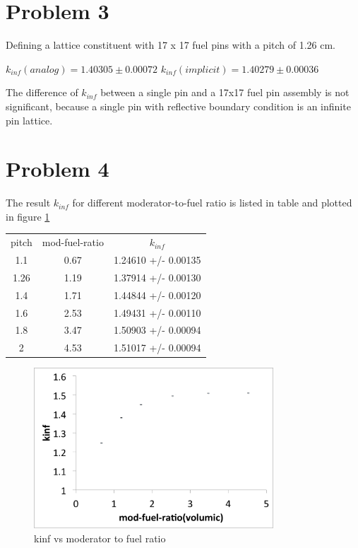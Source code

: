\documentclass[a4paper, 12pt]{article} %
\begin{document}
\section*{Problem 3}
Defining a lattice constituent with 17 x 17 fuel pins with a pitch of 1.26 cm.

$k_{inf} (analog)= 1.40305 \pm 0.00072$ 
$k_{inf} (implicit)= 1.40279 \pm 0.00036$ 

The difference of $k_{inf}$ between a single pin and a 17x17 fuel pin assembly is not significant, because a single pin with reflective boundary condition is an infinite pin lattice. 

\section*{Problem 4}
The result $k_{inf}$ for different moderator-to-fuel ratio is listed in table and plotted in figure \ref{kinf}

\begin{tabular}{c c c}
pitch & mod-fuel-ratio & $k_{inf}$ \\
1.1   & 0.67 & 1.24610 +/- 0.00135 \\ 
1.26  & 1.19 & 1.37914 +/- 0.00130 \\
1.4   & 1.71 & 1.44844 +/- 0.00120\\
1.6   & 2.53 & 1.49431 +/- 0.00110\\
1.8   & 3.47 & 1.50903 +/- 0.00094 \\
2     & 4.53 & 1.51017 +/- 0.00094
\end{tabular}

\begin{figure}
\caption{kinf vs moderator to fuel ratio}
\label{kinf}
\includegraphics[width = 0.8\textwidth]{kinf_ratio.png}
\end{figure}
\end{document}
